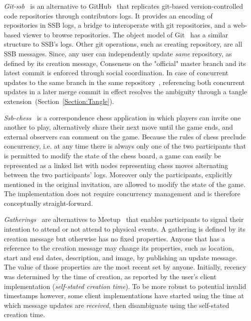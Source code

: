 \documentclass[9pt,sigconf,rewiew]{acmart}
\begin{document}
\textit{Git-ssb}~\cite{git-ssb} is an alternative to GitHub~\cite{github} that
replicates git-based version-controlled code repositories through contributors
logs. It provides an encoding of repositories in SSB logs, a bridge to
interoperate with git repositories, and a web-based viewer to browse
repositories. The object model of Git~\cite{chacon2014pro} has a similar
structure to SSB's logs. Other git operations, such as creating repository, are
all SSB messages. Since, any user can independently update \textit{same} repository, as defined by its creation message, Consensus on the "official" master branch and its latest commit is enforced
through social coordination. In case of concurrent updates to the same branch
in the same repository~\cite{git-ssb-push-conflict}, referencing both concurrent
updates in a later merge commit in effect resolves
the ambiguity through a tangle extension~(Section~\ref{Section:Tangle}).

\textit{Ssb-chess}~\cite{ssb-chess} is a correspondence chess application in
which players can invite one another to play, alternatively share their next
move until the game ends, and external observers can comment on the game.
Because the rules of chess preclude concurrency,  i.e. at any time there is always
 only one of the two participants that is permitted to modify the state of the chess board,
 a game can easily be represented as a linked list with nodes
representing chess moves alternating between the two participants' logs.
Moreover only the participants, explicitly mentioned in the original invitation, are
allowed to modify the state of the game. The implementation does not require
concurrency management and is therefore conceptually straight-forward.

\textit{Gatherings}~\cite{patch-gatherings} are alternatives to
Meetup~\cite{meetup.com} that enables participants to signal their intention to
attend or not attend to physical events. A gathering is defined by its creation message
but otherwise has no fixed properties. Anyone that has a reference to the creation message may
change its properties, such as location, start and end dates, description, and
image, by publishing an update message. The value of those properties are the
most recent set by anyone. Initially, recency was determined by the time of
creation, as reported by the user's client implementation (\textit{self-stated
creation time}). To be more robust to potential invalid
timestamps however, some client implementations have started using the time at
which message updates are \textit{received}, then disambiguate using the
self-stated creation time.
\end{document}
